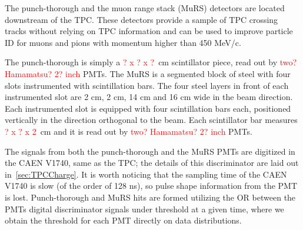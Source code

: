 The punch-thorough and the muon range stack (MuRS) detectors are located downstream of the TPC. These detectors provide a sample of  TPC crossing tracks without relying on TPC information and can be used to improve particle ID for  muons and pions with momentum higher than  450 MeV/c.

The punch-thorough is simply a \textcolor{red}{? x ? x ?}~cm scintillator piece, read out by \textcolor{red}{ two? Hamamatsu? 2? inch} PMTs. 
The MuRS is a segmented block of steel with four slots instrumented with scintillation bars. The four steel layers in front of each instrumented slot are 2 cm, 2 cm, 14 cm and 16 cm wide in the beam direction. Each instrumented slot is equipped with four scintillation bars each, positioned vertically in the direction orthogonal to the beam. Each scintillator bar measures  \textcolor{red}{? x ? x 2}~cm and it is read out by  \textcolor{red}{ two? Hamamatsu? 2? inch} PMTs.  

The signals from both the punch-thorough and the MuRS PMTs are digitized in the CAEN V1740, same as the TPC; the details of this discriminator are laid out in~\ref{sec:TPCCharge}. It is worth noticing that the sampling time of the CAEN V1740 is slow (of the order of 128 ns), so pulse shape information from the PMT is lost.
Punch-thorough and MuRS hits are formed utilizing the OR between the PMTs digital discriminator signals under threshold at a given time, where we obtain the threshold for each PMT directly on data distributions.



